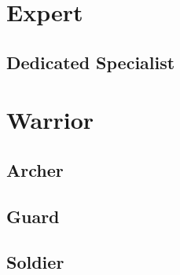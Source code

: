 \documentclass[11pt]{report}
\begin{document}
\section{Expert}
\subsection{Dedicated Specialist}

\section{Warrior}
\subsection{Archer}
\subsection{Guard}
\subsection{Soldier}
\end{document}
